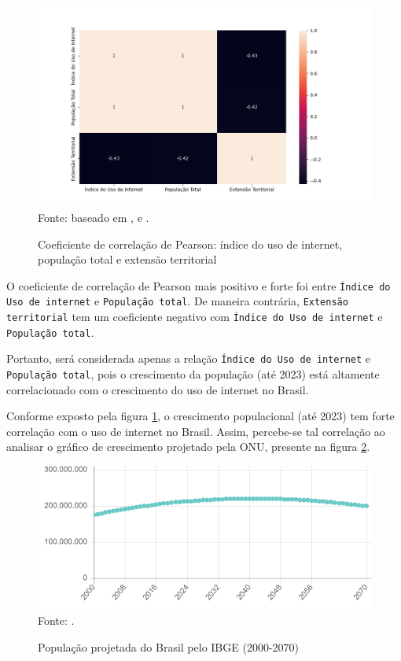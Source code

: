 \begin{figure}[H]
    \centering
    \caption{Coeficiente de correlação de Pearson: índice do uso de internet, população total e extensão territorial}
    \includegraphics[width=1\linewidth]{figuras/internet/correlacao.png}
    \label{fig:internet_correlacao}
    \footnotesize{Fonte: baseado em \cite{ONU_populacao_paises}, \cite{pnda_continua_anual_2016_2023} e \cite{ONU_tamanho_paises}.}
\end{figure}

O coeficiente de correlação de Pearson mais positivo e forte foi entre \texttt{Índice do Uso de internet} e \texttt{População total}. De maneira contrária, \texttt{Extensão territorial} tem um coeficiente negativo com \texttt{Índice do Uso de internet} e \texttt{População total}. 

Portanto, será considerada apenas a relação \texttt{Índice do Uso de internet} e \texttt{População total}, pois o crescimento da população (até 2023) está altamente correlacionado com o crescimento do uso de internet no Brasil.

Conforme exposto pela figura \ref{fig:internet_correlacao}, o crescimento populacional (até 2023) tem forte correlação com o uso de internet no Brasil. Assim, percebe-se tal correlação ao analisar o gráfico de crescimento projetado pela ONU, presente na figura \ref{fig:populacao_brasil}.

\begin{figure}[H]
    \centering
    \caption{População projetada do Brasil pelo IBGE (2000-2070)}
    \includegraphics[width=1\linewidth]{figuras/populacao/populacao_brasil.png}
    \label{fig:populacao_brasil}
    \footnotesize{Fonte: \cite{IBGE_populacao_brasil}.}
\end{figure}

